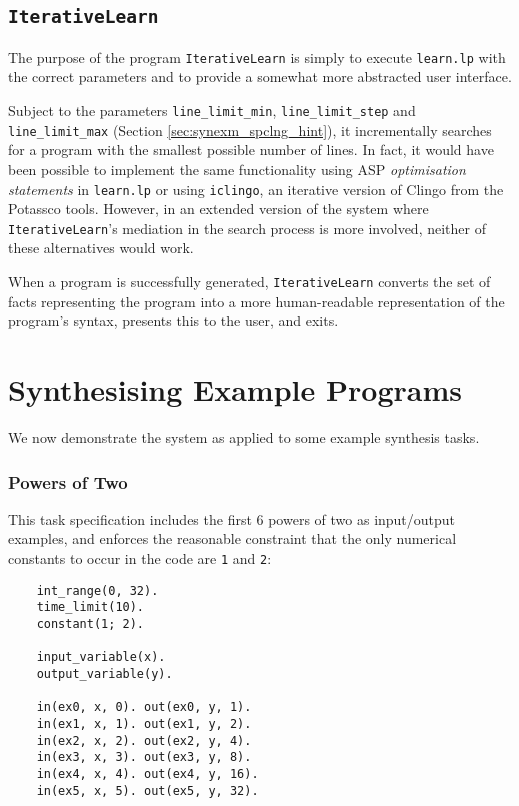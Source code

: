 \documentclass[a4paper,twoside,notitlepage]{report}
\newcommand{\ttt}{\texttt}
\begin{document}
\subsection{\ttt{IterativeLearn}}

The purpose of the program \verb|IterativeLearn| is simply to execute 
\verb|learn.lp| with the correct parameters and to provide a somewhat 
more abstracted user interface.

Subject to the parameters \verb|line_limit_min|, \verb|line_limit_step| 
and \verb|line_limit_max| (Section \ref{sec:synexm_spclng_hint}), it 
incrementally searches for a program with the smallest possible number of 
lines. In fact, it would have been possible to implement the same 
functionality using ASP \emph{optimisation statements} in \verb|learn.lp| 
or using \verb|iclingo|, an iterative version of Clingo from the 
Potassco\cite{potassco} tools. However, in an extended version of the 
system where \verb|IterativeLearn|'s mediation in the search process is 
more involved, neither of these alternatives would work.

When a program is successfully generated, \verb|IterativeLearn| converts 
the set of facts representing the program into a more human-readable 
representation of the program's syntax, presents this to the user, and 
exits.

\section{Synthesising Example Programs}

We now demonstrate the system as applied to some example synthesis tasks.

\subsubsection{Powers of Two}

This task specification includes the first 6 powers of two as input/output 
examples, and enforces the reasonable constraint that the only numerical 
constants to occur in the code are \verb|1| and \verb|2|:
\begin{Verbatim}[samepage=true]
    % pow2_ex.lp
    int_range(0, 32).
    time_limit(10).
    constant(1; 2).

    input_variable(x).
    output_variable(y).

    in(ex0, x, 0). out(ex0, y, 1).
    in(ex1, x, 1). out(ex1, y, 2).
    in(ex2, x, 2). out(ex2, y, 4).
    in(ex3, x, 3). out(ex3, y, 8).
    in(ex4, x, 4). out(ex4, y, 16).
    in(ex5, x, 5). out(ex5, y, 32).
\end{Verbatim}
\end{document}
